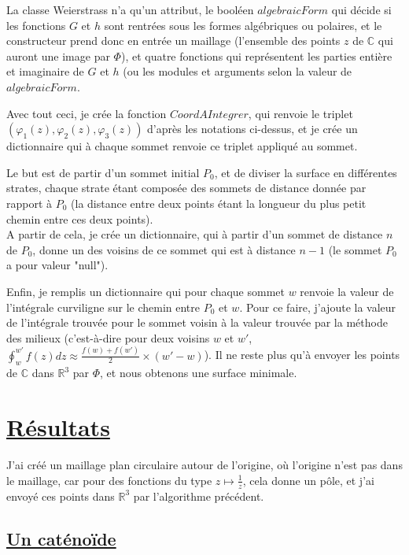 \documentclass {report}
\newcommand{\R}{\mathbb{R}}
\newcommand{\C}{\mathbb{C}}
\begin{document}
La classe Weierstrass n'a qu'un attribut, le booléen $algebraicForm$ qui décide si les fonctions $G$ et $h$ sont rentrées sous les formes algébriques ou polaires, et le constructeur prend donc en entrée un maillage (l'ensemble des points $z$ de $\C$ qui auront une image par $\Phi$), et quatre fonctions qui représentent les parties entière et imaginaire de $G$ et $h$ (ou les modules et arguments selon la valeur de $algebraicForm$.

Avec tout ceci, je crée la fonction $CoordAIntegrer$, qui renvoie le triplet $\left(\varphi_1(z),  \varphi_2(z), \varphi_3(z)\right)$ d'après les notations ci-dessus, et je crée un dictionnaire qui à chaque sommet renvoie ce triplet appliqué au sommet.

Le but est de partir d'un sommet initial $P_0$, et de diviser la surface en différentes strates, chaque strate étant composée des sommets de distance donnée par rapport à $P_0$ (la distance entre deux points étant la longueur du plus petit chemin entre ces deux points).\\
A partir de cela, je crée un dictionnaire, qui à partir d'un sommet de distance $n$ de $P_0$, donne un des voisins de ce sommet qui est à distance $n-1$ (le sommet $P_0$ a pour valeur "null").

Enfin, je remplis un dictionnaire qui pour chaque sommet $w$ renvoie la valeur de l'intégrale curviligne sur le chemin entre $P_0$ et $w$. Pour ce faire, j'ajoute la valeur de l'intégrale trouvée pour le sommet voisin à la valeur trouvée par la méthode des milieux (c'est-à-dire pour deux voisins $w$ et $w'$, $\oint_w^{w'}f(z)dz \approx \frac{f(w)+f(w')}{2}\times (w'-w)$).
Il ne reste plus qu'à envoyer les points de $\C$ dans $\R^3$ par $\Phi$, et nous obtenons une surface minimale. 

\section[Résultats]{\uline{Résultats}}

J'ai créé un maillage plan circulaire autour de l'origine, où l'origine n'est pas dans le maillage, car pour des fonctions du type $z\mapsto \frac{1}{z}$, cela donne un pôle, et j'ai envoyé ces points dans $\R^3$ par l'algorithme précédent. 

\subsection[Un caténoïde]{\uline{Un caténoïde}}
\end{document}
